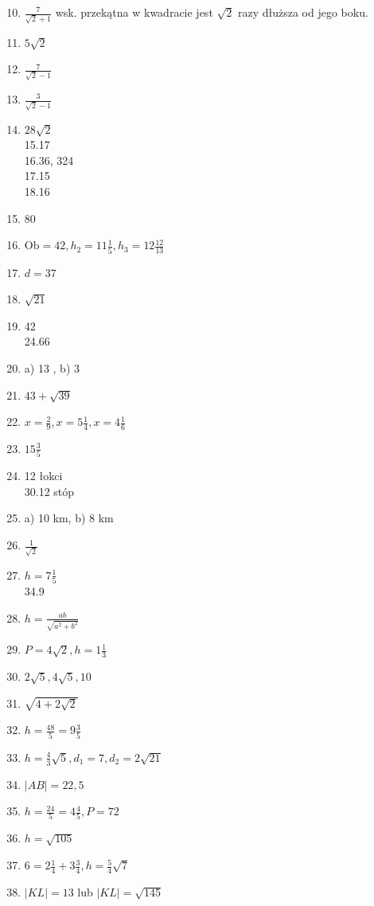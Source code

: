 \documentclass[10pt]{article}
\begin{document}
\begin{enumerate}
  \setcounter{enumi}{9}
  \item \(\frac{7}{\sqrt{2}+1}\) wsk. przekątna w kwadracie jest \(\sqrt{2}\) razy dłuższa od jego boku.
  \item \(5 \sqrt{2}\)
  \item \(\frac{7}{\sqrt{2}-1}\)
  \item \(\frac{3}{\sqrt{2}-1}\)
  \item \(28 \sqrt{2}\)\\
15.17\\
16.36, 324\\
17.15\\
18.16
  \item 80
  \item \(\mathrm{Ob}=42, h_{2}=11 \frac{1}{5}, h_{3}=12 \frac{12}{13}\)
  \item \(d=37\)
  \item \(\sqrt{21}\)
  \item 42\\
24.66
  \item a) 13 , b) 3
  \item \(43+\sqrt{39}\)
  \item \(x=\frac{2}{9}, x=5 \frac{1}{4}, x=4 \frac{1}{6}\)
  \item \(15 \frac{3}{5}\)
  \item 12 łokci\\
30.12 stóp
  \item a) 10 km, b) 8 km
  \item \(\frac{1}{\sqrt{2}}\)
  \item \(h=7 \frac{1}{5}\)\\
34.9
  \item \(h=\frac{a b}{\sqrt{a^{2}+b^{2}}}\)
  \item \(P=4 \sqrt{2}, h=1 \frac{1}{3}\)
  \item \(2 \sqrt{5}, 4 \sqrt{5}, 10\)
  \item \(\sqrt{4+2 \sqrt{2}}\)
  \item \(h=\frac{48}{5}=9 \frac{3}{5}\)
  \item \(h=\frac{4}{3} \sqrt{5}, d_{1}=7, d_{2}=2 \sqrt{21}\)
  \item \(|A B|=22,5\)
  \item \(h=\frac{24}{5}=4 \frac{4}{5}, P=72\)
  \item \(h=\sqrt{105}\)
  \item \(6=2 \frac{1}{4}+3 \frac{3}{4}, h=\frac{5}{4} \sqrt{7}\)
  \item \(|K L|=13\) lub \(|K L|=\sqrt{145}\)

\end{enumerate}
\end{document}
